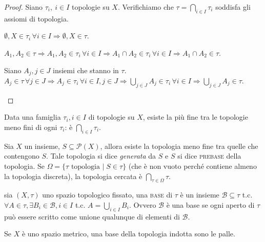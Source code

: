\documentclass{article}
\begin{document}
\begin{proof}
Siano $\tau_i,\ i \in I$ topologie su $X$.
Verifichiamo che $ \tau=\bigcap_{i \in I} \tau_i$ soddisfa gli assiomi di
topologia.

\begin{nlist}
\item $\emptyset, X \in \tau_i \, \forall i \in I \Rightarrow \emptyset, X \in
\tau$.
\item $A_1, A_2 \in \tau \Rightarrow A_1, A_2 \in \tau_i \, \forall i
\in I \Rightarrow A_1 \cap A_2 \in \tau_i \, \forall i \in I \Rightarrow A_1
\cap A_2 \in \tau$.
\item Siano $A_j, j \in J$ insiemi che stanno in $\tau$. \\
$\displaystyle A_j \in \tau \, \forall j \in J \Rightarrow A_j \in \tau_i \,
\forall i \in I, j \in J \Rightarrow {\bigcup_{j \in J} A_j \in \tau_i \,
\forall i \in I} \Rightarrow {\bigcup_{j \in J} A_j \in \tau}$.
\end{nlist}
\end{proof}

\begin{cor}
	Data una famiglia $\tau_i, i \in I$ di topologie su $X$, esiste la più fine
	tra le topologie meno fini di ogni $\tau_i$: è $\displaystyle \bigcap_{i \in
	I} \tau_i$.
\end{cor}

\begin{cor}
	Sia $X$ un insieme, $S \subseteq \mathcal{P}(X)$, allora esiste la topologia
	meno fine tra quelle che contengono $S$. Tale topologia si dice
	\textit{generata} da $S$ e $S$ si dice \textsc{prebase} della topologia. Se
	$\Omega= \{ \tau \text{ topologia } |\; S \in \tau \}$ (che è non vuoto
	perché contiene almeno la topologia discreta), la topologia cercata è
	$\displaystyle \bigcap_{\tau \in \Omega} \tau$.
\end{cor}

\begin{defn}
	sia $(X, \tau)$ uno spazio topologico fissato, una \textsc{base} di $\tau$ è
	un insieme $\mathcal{B} \subseteq \tau$ t.c. $\forall A \in \tau, \exists
	B_i \in \mathcal{B}, i \in I$ t.c. $A= \bigcup_{i \in I} B_i$. Ovvero
	$\mathcal{B}$ \`e una base se ogni aperto di $\tau$ pu\`o essere scritto
	come unione qualunque di elementi di $\mathcal{B}$.
\end{defn}

\begin{ex}
	Se $X$ è uno spazio metrico, una base della topologia indotta sono le palle.
\end{ex}
\end{document}

